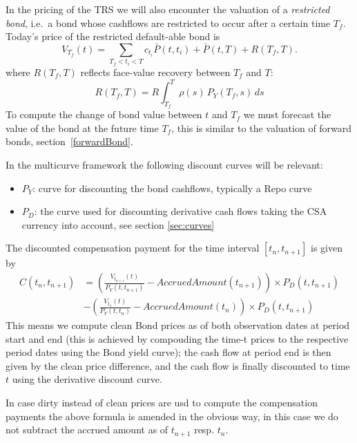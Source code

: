%
\medskip
In the pricing of the TRS we will also encounter the valuation of a
\emph{restricted bond}, i.e.~a bond whose cashflows are restricted to
occur after a certain time $T_f$.
Today's price of the restricted default-able bond is
$$
V_{T_f}(t)=\sum_{T_f<t_i<T} c_{t_i}
\bar P(t,t_i)+\bar P(t,T)+R(T_f,T).
$$
where $R(T_f,T)$ reflects face-value recovery between $T_f$ and
$T$:
$$
R(T_f,T)=R\int_{T_f}^T\rho(s)\,P_{Y}(T_f,s)\,ds
$$
%
To compute the change of bond value between $t$ and $T_f$ we must
forecast the value of the bond at the future time $T_f$,
this is similar to the valuation of forward bonds,
section~\ref{forwardBond}.

In the multicurve framework the following discount curves will be relevant:
\begin{itemize}
\item  $P_{Y}$: curve for discounting the bond cashflows, typically
  a Repo curve
\item $P_{D}$: the curve used for discounting derivative cash flows
  taking the CSA currency into account, see section \ref{sec:curves}
\end{itemize}

The discounted compensation payment for the time interval $[t_n,t_{n+1}]$
is given by
\begin{align*}
  C(t_n,t_{n+1})&=\left(\frac{V_{t_{n+1}}(t)}{P_{Y}(t,t_{n+1})} -AccruedAmount(t_{n+1})\right) \times P_{D}(t,t_{n+1}) \\
                &-\left(\frac{V_{t_{n}}(t)}{P_{Y}(t,t_{n})} -AccruedAmount(t_{n})\right) \times P_{D}(t,t_{n+1})
\end{align*}
This means we compute clean Bond prices as of both observation
dates at period start and end (this is achieved by compouding the
time-t prices to the respective period dates using the Bond yield
curve);  the cash flow at period end is then given by the clean price
difference, and the cash flow is finally discounted to time $t$ using
the derivative discount curve.

In case dirty instead of clean prices are usd to compute the compensation payments the above formula is amended in the
obvious way, in this case we do not subtract the accrued amount as of $t_{n+1}$ resp. $t_{n}$.

